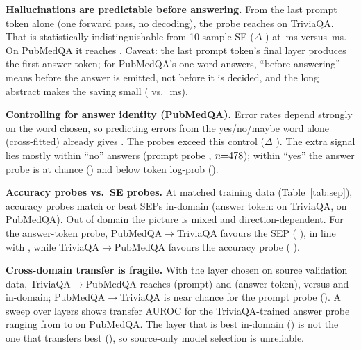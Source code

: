 \documentclass[10pt,twocolumn]{article}
\begin{document}
\textbf{Hallucinations are predictable before answering.} From the last prompt token
alone (one forward pass, no decoding), the probe reaches \TqAucProbePrompt{} on TriviaQA.
That is statistically indistinguishable from 10-sample SE ($\Delta$ \TqDProbePromptvsSEten{}
\TqDCiProbePromptvsSEten{}) at \TqMsProbePrompt{}\,ms versus \TqMsSEten{}\,ms. On PubMedQA it
reaches \PmAucProbePrompt{}. Caveat: the last prompt token's final layer produces the first
answer token; for PubMedQA's one-word answers, ``before answering'' means before the answer
is emitted, not before it is decided, and the long abstract makes the saving small
(\PmMsProbePrompt{} vs.\ \PmMsLogProb{}\,ms).

\textbf{Controlling for answer identity (PubMedQA).} Error rates depend strongly on the
word chosen, so predicting errors from the yes/no/maybe word alone (cross-fitted) already
gives \PmAucAnsId{}. The probes exceed this control ($\Delta$ \PmDProbeAnsvsAnsId{}
\PmDCiProbeAnsvsAnsId{}). The extra signal lies mostly within ``no'' answers
(prompt probe \PmWithinNoProbePrompt{}, $n{=}478$); within ``yes'' the answer
probe is at chance (\PmWithinYesProbeAns{}) and below token log-prob (\PmWithinYesLogProb{}).

\begin{table}[t]
\centering\scriptsize

\caption{Accuracy probes vs.\ SE probes (SEP; target: binarized 10-sample SE),
both trained on the same 500 questions per dataset. $\Delta$ = accuracy $-$ SEP.}
\label{tab:sep}
\end{table}

\textbf{Accuracy probes vs.\ SE probes.} At matched training data (Table~\ref{tab:sep}),
accuracy probes match or beat SEPs in-domain (answer token: \SepInTqAnsD{} on TriviaQA,
\SepInPmAnsD{} on PubMedQA). Out of domain the picture is mixed and direction-dependent.
For the answer-token probe, PubMedQA$\to$TriviaQA favours the SEP (\SepTrPmTqAnsD{}
\SepTrPmTqAnsDCi{}), in line with \citet{kossen2024sep}, while TriviaQA$\to$PubMedQA favours
the accuracy probe (\SepTrTqPmAnsD{} \SepTrTqPmAnsDCi{}).

\textbf{Cross-domain transfer is fragile.} With the layer chosen on source validation data,
TriviaQA$\to$PubMedQA reaches \TrTqtoPmProbePrompt{} (prompt) and \TrTqtoPmProbeAns{}
(answer token), versus \PmTestProbePrompt{} and \PmTestProbeAns{} in-domain;
PubMedQA$\to$TriviaQA is near chance for the prompt probe (\TrPmtoTqProbePrompt{}). A sweep
over layers shows transfer AUROC for the TriviaQA-trained answer probe ranging from
\TrSweepTqtoPmProbeAnsMin{} to \TrSweepTqtoPmProbeAnsMax{} on PubMedQA. The layer that is best
in-domain (\TrSweepTqtoPmProbeAnsSel{}) is not the one that transfers best
(\TrSweepTqtoPmProbeAnsBest{}), so source-only model selection is unreliable.
\end{document}

